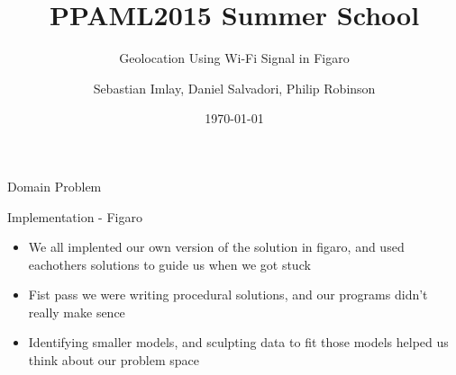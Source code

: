 \documentclass[11pt]{beamer}
\begin{document}
\title{PPAML2015 Summer School}

\subtitle{Geolocation Using Wi-Fi Signal in Figaro}

\author{Sebastian Imlay, Daniel Salvadori, Philip Robinson}


\date{\today}

\begin{frame}
  \titlepage
\end{frame}


\begin{frame}{Domain Problem}

\end{frame}
\begin{frame}{Implementation - Figaro}
\begin{multicols}{2}
\resizebox{!}{1.5in}{
}
\columnbreak

\begin{itemize}
\item We all implented our own version of the solution in figaro, and used eachothers solutions to guide us when we got stuck
\item Fist pass we were writing procedural solutions, and our programs didn't really make sence
\item Identifying smaller models, and sculpting data to fit those models helped us think about our problem space
\end{itemize}
\end{multicols}

\end{frame}
\end{document}
